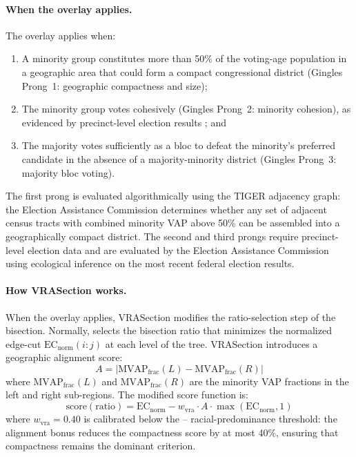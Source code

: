 \paragraph{When the overlay applies.}
The overlay applies when:
\begin{enumerate}
  \item A minority group constitutes more than 50\% of the voting-age population
    in a geographic area that could form a compact congressional district
    (Gingles Prong~1: geographic compactness and size);
  \item The minority group votes cohesively (Gingles Prong~2: minority cohesion),
    as evidenced by precinct-level election results \citep{fekrazad2021}; and
  \item The majority votes sufficiently as a bloc to defeat the minority's
    preferred candidate in the absence of a majority-minority district
    (Gingles Prong~3: majority bloc voting).
\end{enumerate}

The first prong is evaluated algorithmically using the TIGER adjacency graph:
the Election Assistance Commission determines whether any set of adjacent
census tracts with combined minority VAP above 50\% can be assembled into
a geographically compact district.
The second and third prongs require precinct-level election data and are
evaluated by the Election Assistance Commission using ecological inference
\citep{imai2020} on the most recent federal election results.

\paragraph{How VRASection works.}
When the overlay applies, VRASection modifies the ratio-selection step of
the \hh{} bisection.
Normally, \ar{} selects the bisection ratio that minimizes the normalized
edge-cut $\mathrm{EC}_\text{norm}(i:j)$ at each level of the tree.
VRASection introduces a geographic alignment score:
\[
  A = \left|\text{MVAP}_\text{frac}(L) - \text{MVAP}_\text{frac}(R)\right|
\]
where $\text{MVAP}_\text{frac}(L)$ and $\text{MVAP}_\text{frac}(R)$ are
the minority VAP fractions in the left and right sub-regions.
The modified score function is:
\[
  \text{score}(\text{ratio}) = \mathrm{EC}_\text{norm} - w_\text{vra} \cdot A \cdot \max(\mathrm{EC}_\text{norm}, 1)
\]
where $w_\text{vra} = 0.40$ is calibrated below the \shaw{}--\miller{}
racial-predominance threshold: the alignment bonus reduces the compactness
score by at most 40\%, ensuring that compactness remains the dominant criterion.


